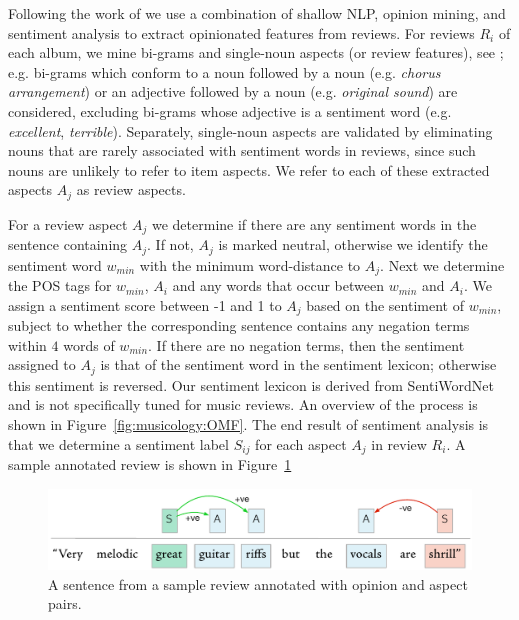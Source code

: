 Following the work of \cite{DongSOS13,DongOS14} we use a combination of shallow NLP, opinion mining, and sentiment analysis to extract opinionated features from reviews. For reviews $R_{i}$ of each album, we mine bi-grams and single-noun aspects (or review features), see \cite{Hu2004}; e.g. bi-grams which conform to a noun followed by a noun (e.g. \emph{chorus arrangement}) or an adjective followed by a noun (e.g. \emph{original sound}) are considered, excluding bi-grams whose adjective is a sentiment word (e.g. \emph{excellent}, \emph{terrible}). Separately, single-noun aspects are validated by eliminating nouns that are rarely associated with sentiment words in reviews, since such nouns are unlikely to refer to item aspects. We refer to each of these extracted aspects $A_{j}$ as review aspects.

For a review aspect $A_{j}$ we determine if there are any sentiment words in the sentence containing $A_{j}$. If not, $A_{j}$ is marked neutral, otherwise we identify the sentiment word $w_{min}$ with the minimum word-distance to $A_j$. Next we determine the POS tags for $w_{min}$, $A_i$ and any words that occur between $w_{min}$ and $A_i$. 
We assign a sentiment score between -1 and 1 to $A_j$ based on the sentiment of $w_{min}$, subject to whether the corresponding sentence contains any negation terms within $4$ words of $w_{min}$. If there are no negation terms, then the sentiment assigned to $A_j$ is that of the sentiment word in the sentiment lexicon; otherwise this sentiment is reversed. Our sentiment lexicon is derived from SentiWordNet \cite{esuli2006sentiwordnet} and is not specifically tuned for music reviews.
An overview of the process is shown in Figure~\ref{fig:musicology:OMF}. The end result of sentiment analysis is that we determine a sentiment label $S_{ij}$ for each aspect $A_j$ in review $R_i$. A sample annotated review is shown in Figure~\ref{fig:musicology:annotatedreview}

\begin{figure}[h]
\includegraphics[width=\columnwidth]{ch05_musicology/pics/annotation_sample2}
\caption{A sentence from a sample review annotated with opinion and aspect pairs.}
\label{fig:musicology:annotatedreview}
\end{figure}



